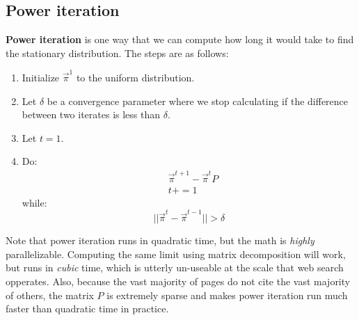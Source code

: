 \documentclass[titlepage, 12pt, leqno]{article}
\begin{document}
\subsection{Power iteration}
\begin{definition}
    \textbf{Power iteration} is one way that we can compute how long it would take
    to find the stationary distribution. The steps are as follows:
    \begin{enumerate}
        \item Initialize $\vec \pi^{1}$ to the uniform distribution.
        \item Let $\delta$ be a convergence parameter where we stop calculating
            if the difference between two iterates is less than $\delta$.
        \item Let $t=1$.
        \item Do:
            \begin{align*}
                &\vec \pi^{t+1} - \vec \pi^{t}P \\
                & t += 1
            \end{align*}
        while:
        \[
            ||\vec \pi^{t} - \vec \pi^{t-1}|| > \delta
        \]
    \end{enumerate}
\end{definition}
Note that power iteration runs in quadratic time, but the math is \textit{highly}
parallelizable. Computing the same limit using matrix decomposition will work,
but runs in \textit{cubic} time, which is utterly un-useable at the scale that
web search opperates. Also, because the vast majority of pages do not cite the
vast majority of others, the matrix $P$ is extremely sparse and makes power
iteration run much faster than quadratic time in practice.
\end{document}
